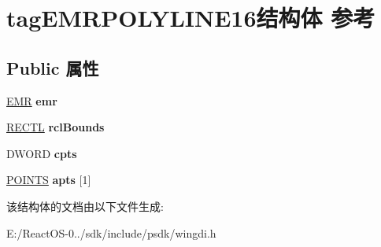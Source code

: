 \hypertarget{structtag_e_m_r_p_o_l_y_l_i_n_e16}{}\section{tag\+E\+M\+R\+P\+O\+L\+Y\+L\+I\+N\+E16结构体 参考}
\label{structtag_e_m_r_p_o_l_y_l_i_n_e16}
\subsection*{Public 属性}
\begin{DoxyCompactItemize}
\item 
\mbox{\label{structtag_e_m_r_p_o_l_y_l_i_n_e16_a18345c8f03f49e200c0fdccd22ef3170}} 
\hyperlink{structtag_e_m_r}{E\+MR} {\bfseries emr}
\item 
\mbox{\label{structtag_e_m_r_p_o_l_y_l_i_n_e16_afa734a247b939196d32502e87d2e3fd1}} 
\hyperlink{struct___r_e_c_t_l}{R\+E\+C\+TL} {\bfseries rcl\+Bounds}
\item 
\mbox{\label{structtag_e_m_r_p_o_l_y_l_i_n_e16_ada9d07563229b1c0446513fd9023892d}} 
D\+W\+O\+RD {\bfseries cpts}
\item 
\mbox{\label{structtag_e_m_r_p_o_l_y_l_i_n_e16_ad3f422b5776598aee7b0a9fca00fe10a}} 
\hyperlink{structtag_p_o_i_n_t_s}{P\+O\+I\+N\+TS} {\bfseries apts} \mbox{[}1\mbox{]}
\end{DoxyCompactItemize}


该结构体的文档由以下文件生成\+:\begin{DoxyCompactItemize}
\item 
E\+:/\+React\+O\+S-\/0../sdk/include/psdk/wingdi.\+h\end{DoxyCompactItemize}

